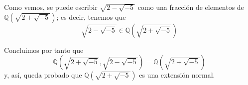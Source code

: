 \documentclass[a4paper, 11pt]{article}
\begin{document}
  Como vemos, se puede escribir $\sqrt{2-\sqrt{-5}}$ como una fracción de elementos de $\mathbb{Q}(\sqrt{2+\sqrt{-5}})$; es decir, tenemos que
  \[
  \sqrt{2-\sqrt{-5}}\in\mathbb{Q}(\sqrt{2+\sqrt{-5}})
  \]

  Concluimos por tanto que
  \[
  \mathbb{Q}(\sqrt{2+\sqrt{-5}},\sqrt{2-\sqrt{-5}}) = \mathbb{Q}(\sqrt{2+\sqrt{-5}})
  \]
  y, así, queda probado que $\mathbb{Q}(\sqrt{2+\sqrt{-5}})$ es una extensión normal.
\end{document}
